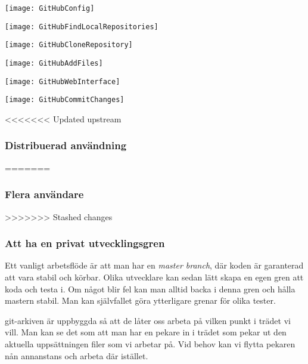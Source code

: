 \documentclass[swedish]{beamer}
\begin{document}
\begin{frame}[fragile]
\texttt{[image: GitHubConfig]}
\end{frame}

\begin{frame}[fragile]
\texttt{[image: GitHubFindLocalRepositories]}
\end{frame}

\begin{frame}
\texttt{[image: GitHubCloneRepository]}
\end{frame}

\begin{frame}[fragile]
\texttt{[image: GitHubAddFiles]}
\end{frame}

\begin{frame}[fragile]
\texttt{[image: GitHubWebInterface]}
\end{frame}

\begin{frame}[fragile]
\texttt{[image: GitHubCommitChanges]}
\end{frame}

\begin{frame}[fragile]
<<<<<<< Updated upstream
\frametitle{Distribuerad användning}
=======
\frametitle{Flera användare}
>>>>>>> Stashed changes
\end{frame}

\begin{frame}[fragile]

\end{frame}






\begin{frame}[fragile]
\frametitle{Att ha en privat utvecklingsgren}
Ett vanligt arbetsflöde är att man har en \emph{master branch}, där koden är garanterad att vara stabil och körbar.  Olika utvecklare kan sedan lätt skapa en egen gren att koda och testa i.  Om något blir fel kan man alltid backa i denna gren och hålla mastern stabil.  Man kan självfallet göra ytterligare grenar för olika tester.

git-arkiven är uppbyggda så att de låter oss arbeta på vilken punkt i trädet vi vill.  Man kan se det som att man har en pekare in i trädet som pekar ut den aktuella uppsättningen filer som vi arbetar på.  Vid behov kan vi flytta pekaren nån annanstans och arbeta där istället.
\end{frame}
\end{document}
